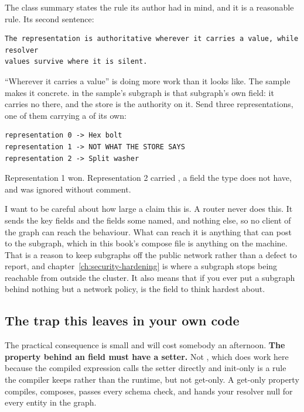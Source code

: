 The class summary states the rule its author had in mind, and it is a
reasonable rule. Its second sentence:

\begin{verbatim}
The representation is authoritative wherever it carries a value, while resolver
values survive where it is silent.
\end{verbatim}

\enquote{Wherever it carries a value} is doing more work than it looks like.
The sample makes it concrete.  in the sample's 
subgraph is that subgraph's own field: it carries no  there,
and the store is the authority on it. Send three representations, one of them
carrying a  of its own:

\begin{verbatim}
representation 0 -> Hex bolt
representation 1 -> NOT WHAT THE STORE SAYS
representation 2 -> Split washer
\end{verbatim}

Representation 1 won. Representation 2 carried , a field the
type does not have, and was ignored without comment.

%
I want to be careful about how large a claim this is. A router never does this.
It sends the key fields and the fields some  named, and nothing
else, so no client of the graph can reach the behaviour. What can reach it is
anything that can post to the subgraph, which in this book's compose file is
anything on the machine. That is a reason to keep subgraphs off the public
network rather than a defect to report, and
chapter~\ref{ch:security-hardening} is where a subgraph stops being reachable
from outside the cluster. It also means that if you ever put a subgraph behind
nothing but a network policy,  is the field to think hardest
about.

\subsection*{The trap this leaves in your own code}

%
The practical consequence is small and will cost somebody an afternoon.
\textbf{The property behind an  field must have a setter.} Not
, which does work here because the compiled expression calls the
setter directly and init-only is a rule the compiler keeps rather than the
runtime, but not get-only. A get-only property compiles, composes, passes every
schema check, and hands your resolver null for every entity in the graph.

